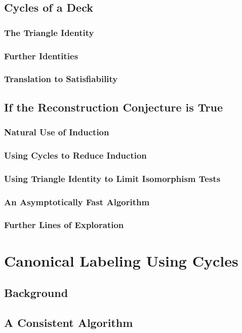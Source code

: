 \documentclass[11pt,a4paper]{report}
\begin{document}
\section{Cycles of a Deck}
\subsection{The Triangle Identity}
\subsection{Further Identities}
\subsection{Translation to Satisfiability}

\section{If the Reconstruction Conjecture is True}
\subsection{Natural Use of Induction}
\subsection{Using Cycles to Reduce Induction}
\subsection{Using Triangle Identity to Limit Isomorphism Tests}
\subsection{An Asymptotically Fast Algorithm}
\subsection{Further Lines of Exploration}



\chapter{Canonical Labeling Using Cycles}
\section{Background}
\section{A Consistent Algorithm}
\end{document}
